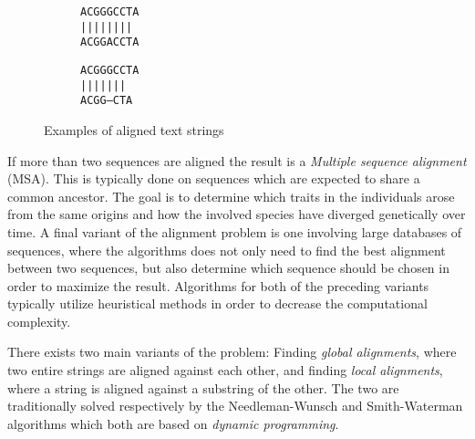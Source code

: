 \documentclass[thesis.tex]{subfiles}
\begin{document}
\setlength{\intextsep}{0mm}
\begin{wrapfigure}[15]{l}{0.3\textwidth}
  \begin{mdframed}
    \begin{subfigure}[t]{\textwidth}
      \begin{mdframed}
        \begin{center}
          \texttt{ACGGGCCTA}\\
          \texttt{||||\space||||}\\
          \texttt{ACGGACCTA}
        \end{center}
      \end{mdframed}
      \captionsetup{skip=-8pt}
    \end{subfigure}
    \begin{subfigure}[b]{\textwidth}
      \begin{mdframed}
        \begin{center}
          \texttt{ACGGGCCTA}\\
          \texttt{||||\space\space|||}\\
          \texttt{ACGG---CTA}
        \end{center}
      \end{mdframed}
      \captionsetup{skip=-8pt}
    \end{subfigure}
  \end{mdframed}
  \vspace*{-5mm}
  \caption[Examples of aligned text strings]{Examples of aligned text strings}
  \label{fig:alignments}
\end{wrapfigure}
If more than two sequences are aligned the result is a \textit{Multiple sequence alignment} (MSA). This is typically done on sequences which are expected to share a common ancestor. The goal is to determine which traits in the individuals arose from the same origins and how the involved species have diverged genetically over time. A final variant of the alignment problem is one involving large databases of sequences, where the algorithms does not only need to find the best alignment between two sequences, but also determine which sequence should be chosen in order to maximize the result. Algorithms for both of the preceding variants typically utilize heuristical methods in order to decrease the computational complexity.\\
\par\noindent
There exists two main variants of the problem: Finding \textit{global alignments}, where two entire strings are aligned against each other, and finding \textit{local alignments}, where a string is aligned against a substring of the other. The two are traditionally solved respectively by the Needleman-Wunsch and Smith-Waterman algorithms which both are based on \textit{dynamic programming}.
\end{document}
